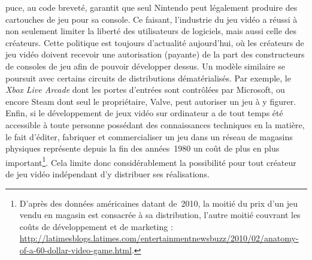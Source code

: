 \documentclass{FramateX}
\begin{document}
\begin{refsection}
puce, au code breveté, garantit que seul Nintendo peut légalement produire
des cartouches de jeu pour sa console. Ce faisant, l'industrie du jeu
vidéo a réussi à non seulement limiter la liberté des utilisateurs de
logiciels, mais aussi celle des créateurs. Cette politique est toujours
d'actualité aujourd'hui, où les créateurs de jeu vidéo doivent recevoir
une autorisation (payante) de la part des constructeurs de consoles de
jeu afin de pouvoir développer dessus. Un modèle similaire se poursuit
avec certains circuits de distributions dématérialisés. Par exemple, le
\textit{Xbox Live Arcade} dont les portes
d'entrées sont contrôlées par Microsoft, ou encore Steam dont seul le propriétaire, Valve, peut autoriser un jeu à y
figurer. Enfin, si le développement de jeux vidéo sur ordinateur a de
tout temps été accessible à toute personne possédant des connaissances
techniques en la matière, le fait d'éditer, fabriquer et commercialiser
un jeu dans un réseau de magasins physiques représente depuis la fin
des années~1980 un coût de plus en plus important\footnote{D'après
des données américaines datant de~2010, la moitié du prix d'un jeu
vendu en magasin est consacrée à sa distribution, l'autre moitié
couvrant les coûts de développement et de marketing :
\url{http://latimesblogs.latimes.com/entertainmentnewsbuzz/2010/02/anatomy-of-a-60-dollar-video-game.html}.}. Cela limite donc considérablement la possibilité
pour tout créateur de jeu vidéo indépendant d'y distribuer ses
réalisations.


\end{refsection}
\end{document}
